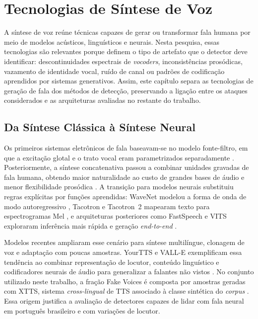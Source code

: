 \documentclass[12pt,a4paper]{article}
\begin{document}
\section{Tecnologias de Síntese de Voz}
\label{sec:tecnologias_sintese}

A síntese de voz reúne técnicas capazes de gerar ou transformar fala humana por
meio de modelos acústicos, linguísticos e neurais. Nesta pesquisa, essas
tecnologias são relevantes porque definem o tipo de artefato que o detector deve
identificar: descontinuidades espectrais de \textit{vocoders}, inconsistências
prosódicas, vazamento de identidade vocal, ruído de canal ou padrões de
codificação aprendidos por sistemas generativos. Assim, este capítulo separa as
tecnologias de geração de fala dos métodos de detecção, preservando a ligação
entre os ataques considerados e as arquiteturas avaliadas no restante do
trabalho.

\subsection{Da Síntese Clássica à Síntese Neural}

Os primeiros sistemas eletrônicos de fala baseavam-se no modelo fonte-filtro,
em que a excitação glotal e o trato vocal eram parametrizados separadamente
\cite{dudley1939,klatt1987}. Posteriormente, a síntese concatenativa passou a
combinar unidades gravadas de fala humana, obtendo maior naturalidade ao custo
de grandes bases de áudio e menor flexibilidade prosódica \cite{hunt1996}. A
transição para modelos neurais substituiu regras explícitas por funções
aprendidas: WaveNet modelou a forma de onda de modo autoregressivo
\cite{oord2016wavenet}, Tacotron e Tacotron~2 mapearam texto para
espectrogramas Mel \cite{wang2017,shen2018natural}, e arquiteturas posteriores
como FastSpeech e VITS exploraram inferência mais rápida e geração
\textit{end-to-end} \cite{ren2019fastspeech,kim2021conditional}.

Modelos recentes ampliaram esse cenário para síntese multilíngue, clonagem de
voz e adaptação com poucas amostras. YourTTS e VALL-E exemplificam essa
tendência ao combinar representação de locutor, conteúdo linguístico e
codificadores neurais de áudio para generalizar a falantes não vistos
\cite{casanova2022yourtts,wang2023vall}. No conjunto utilizado neste trabalho, a
fração Fake Voices é composta por amostras geradas com XTTS, sistema
\textit{cross-lingual} de TTS associado à classe sintética do \textit{corpus}
\cite{fakevoices_card}. Essa origem justifica a avaliação de detectores capazes
de lidar com fala neural em português brasileiro e com variações de locutor.
\end{document}
